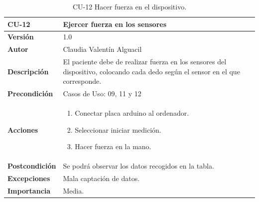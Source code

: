 \begin{table}[p]
	\centering
	\begin{tabularx}{\linewidth}{ p{} p{} }
		\toprule
		\textbf{CU-12}    & \textbf{Ejercer fuerza en los sensores}\\
		\toprule
		\textbf{Versión}              & 1.0    \\
		\textbf{Autor}                & Claudia Valentín Alguacil \\
		 
		\textbf{Descripción}          & El paciente debe de realizar fuerza en los sensores del dispositivo, colocando cada dedo según el sensor en el que corresponde. \\
		\textbf{Precondición}         &  Casos de Uso: 09, 11 y 12\\
		\textbf{Acciones}             &
		\begin{enumerate}
			\def\labelenumi{\arabic{enumi}.}
			\tightlist
			\item Conectar placa arduino al ordenador.
			\item Seleccionar iniciar medición.
                \item Hacer fuerza en la mano.
		\end{enumerate}\\
		\textbf{Postcondición}        &  Se podrá observar los datos recogidos en la tabla. \\
		\textbf{Excepciones}          & Mala captación de datos. \\
		\textbf{Importancia}          & Media. \\
		\bottomrule
	\end{tabularx}
	\caption{CU-12 Hacer fuerza en el dispositivo.}
\end{table}

